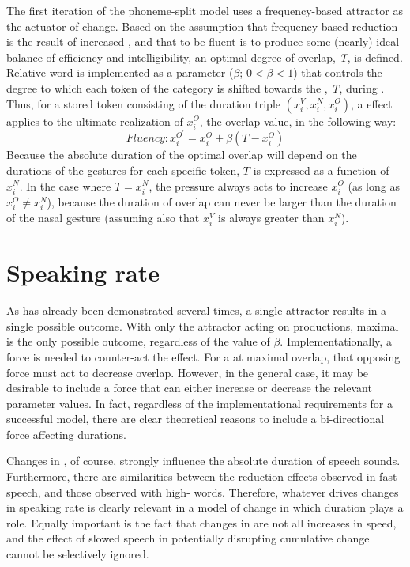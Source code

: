 The first iteration of the phoneme-split model uses a frequency-based
attractor as the actuator of change. Based on the assumption that
frequency-based reduction is the result of increased , and
that to be fluent is to produce some (nearly) ideal balance of efficiency
and intelligibility, an optimal degree of  overlap, \emph{T},
is defined. Relative word  is implemented as a parameter
($\beta$; $0<\beta<1$) that controls the degree to which each token
of the category is shifted towards the , \emph{T}, during .
Thus, for a stored  token consisting of the duration triple
$(x_{i}^{V},x_{i}^{N},x_{i}^{O})$, a  effect applies to the
ultimate realization of $x_{i}^{O}$, the  overlap value,
in the following way: 
\begin{equation}
\textit{Fluency}:x_{i}^{O^{\prime}}=x_{i}^{O}+\beta(T-x_{i}^{O})\label{eq:Frequency attractor}
\end{equation}
Because the absolute duration of the optimal  overlap will
depend on the durations of the gestures for each specific token, $T$
is expressed as a function of $x_{i}^{N}$. In the case where $T=x_{i}^{N}$,
the  pressure always acts to increase $x_{i}^{O}$ (as long
as $x_{i}^{O}\neq x_{i}^{N}$), because the duration of overlap can
never be larger than the duration of the nasal gesture (assuming also
that $x_{i}^{V}$ is always greater than $x_{i}^{N}$). 

\section{Speaking rate}

As has already been demonstrated several times, a single attractor
results in a single possible outcome. With only the  attractor
acting on productions, maximal  is the only possible outcome,
regardless of the value of $\beta$. Implementationally, a force is
needed to counter-act the  effect. For a   at
maximal overlap, that opposing force must act to decrease overlap.
However, in the general case, it may be desirable to include a force
that can either increase or decrease the relevant parameter values.
In fact, regardless of the implementational requirements for a successful
model, there are clear theoretical reasons to include a bi-directional
force affecting  durations. 

Changes in , of course, strongly influence the absolute
duration of speech sounds. Furthermore, there are similarities between
the reduction effects observed in fast speech, and those observed
with high- words. Therefore, whatever drives changes in speaking
rate is clearly relevant in a model of change in which duration plays
a role. Equally important is the fact that changes in 
are not all increases in speed, and the effect of slowed speech in
potentially disrupting cumulative change cannot be selectively ignored. 

